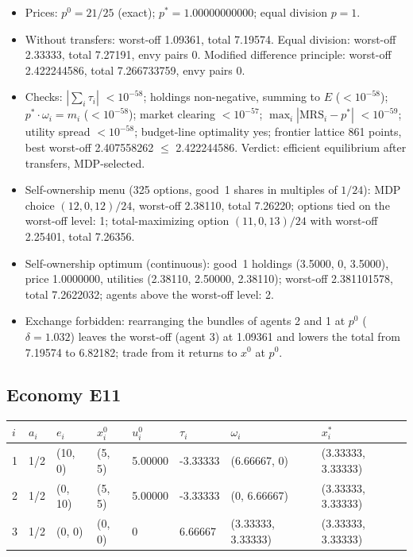 \begin{itemize}[leftmargin=1.2em,itemsep=0pt,topsep=2pt]\footnotesize
\item Prices: $p^0 = 21/25$ (exact); $p^* = 1.00000000000$; equal division $p = 1$.
\item Without transfers: worst-off 1.09361, total 7.19574. Equal division: worst-off 2.33333, total 7.27191, envy pairs 0. Modified difference principle: worst-off 2.422244586, total 7.266733759, envy pairs 0.
\item Checks: $|\sum_i\tau_i|$ $<10^{-58}$; holdings non-negative, summing to $E$ ($<10^{-58}$); $p^*\cdot\omega_i = m_i$ ($<10^{-58}$); market clearing $<10^{-57}$; $\max_i|\mathrm{MRS}_i - p^*|$ $<10^{-59}$; utility spread $<10^{-58}$; budget-line optimality yes; frontier lattice 861 points, best worst-off 2.407558262 $\leq$ 2.422244586. Verdict: efficient equilibrium after transfers, MDP-selected.
\item Self-ownership menu (325 options, good~1 shares in multiples of $1/24$): MDP choice $(12, 0, 12)/24$, worst-off 2.38110, total 7.26220; options tied on the worst-off level: 1; total-maximizing option $(11, 0, 13)/24$ with worst-off 2.25401, total 7.26356.
\item Self-ownership optimum (continuous): good~1 holdings (3.5000, 0, 3.5000), price 1.0000000, utilities (2.38110, 2.50000, 2.38110); worst-off 2.381101578, total 7.2622032; agents above the worst-off level: 2.
\item Exchange forbidden: rearranging the bundles of agents 2 and 1 at $p^0$ ($\delta = 1.032$) leaves the worst-off (agent 3) at 1.09361 and lowers the total from 7.19574 to 6.82182; trade from it returns to $x^0$ at $p^0$.
\end{itemize}

\subsection*{Economy E11}
\label{ec:E11}
{\scriptsize\setlength{\tabcolsep}{3pt}
\begin{tabular}{@{}llllllll@{}}
\toprule
$i$ & $a_i$ & $e_i$ & $x^0_i$ & $u^0_i$ & $\tau_i$ & $\omega_i$ & $x^*_i$ \\
\midrule
1 & 1/2 & (10, 0) & (5, 5) & 5.00000 & -3.33333 & (6.66667, 0) & (3.33333, 3.33333) \\
2 & 1/2 & (0, 10) & (5, 5) & 5.00000 & -3.33333 & (0, 6.66667) & (3.33333, 3.33333) \\
3 & 1/2 & (0, 0) & (0, 0) & 0 & 6.66667 & (3.33333, 3.33333) & (3.33333, 3.33333) \\
\bottomrule\end{tabular}}

